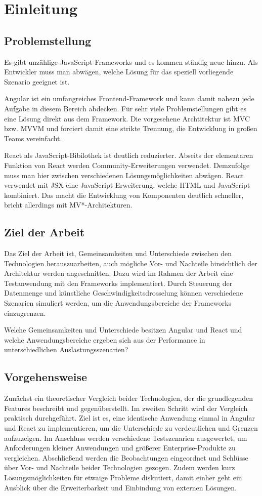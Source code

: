 \chapter{Einleitung}

\section{Problemstellung}
Es gibt unzählige JavaScript-Frameworks und es kommen ständig neue hinzu. Als Entwickler muss man abwägen,
welche Lösung für das speziell vorliegende Szenario geeignet ist.

Angular ist ein umfangreiches Frontend-Framework und kann damit nahezu
jede Aufgabe in diesem Bereich abdecken. Für sehr viele Problemstellungen
gibt es eine Lösung direkt aus dem Framework. Die vorgesehene Archtitektur ist
MVC bzw. MVVM und forciert damit eine strikte Trennung, die Entwicklung in großen Teams vereinfacht.

React als JavaScript-Bibilothek ist deutlich reduzierter. Abseits der elementaren Funktion von React
werden Community-Erweiterungen verwendet. Demzufolge muss man hier zwischen verschiedenen 
Lösungsmöglichkeiten abwägen. React verwendet mit JSX eine JavaScript-Erweiterung, 
welche HTML und JavaScript kombiniert. Das macht die Entwicklung von Komponenten deutlich schneller,
bricht allerdings mit MV*-Architekturen.

\section{Ziel der Arbeit}
Das Ziel der Arbeit ist, Gemeinsamkeiten und Unterschiede zwischen den Technologien herauszuarbeiten,
auch mögliche Vor- und Nachteile hinsichtlich der Architektur werden angeschnitten.
Dazu wird im Rahmen der Arbeit eine Testanwendung mit den Frameworks implementiert.
Durch Steuerung der Datenmenge und künstliche Geschwindigkeitsdrosselung können verschiedene
Szenarien simuliert werden, um die Anwendungsbereiche der Frameworks einzugrenzen.

Welche Gemeinsamkeiten und Unterschiede besitzen Angular und React und welche Anwendungsbereiche
ergeben sich aus der Performance in unterschiedlichen Auslastungsszenarien?

\section{Vorgehensweise}

Zunächst ein theoretischer Vergleich beider Technologien, der die grundlegenden Features beschreibt und gegenüberstellt.
Im zweiten Schritt wird der Vergleich praktisch durchgeführt. Ziel ist es, eine identische Anwendung einmal in Angular
und React zu implementieren, um die Unterschiede zu verdeutlichen und Grenzen aufzuzeigen. Im Anschluss werden verschiedene
Testszenarien ausgewertet, um Anforderungen kleiner Anwendungen und größerer Enterprise-Produkte zu vergleichen. 
Abschließend werden die Beobachtungen eingeordnet und Schlüsse über Vor- und Nachteile beider Technologien gezogen.
Zudem werden kurz Lösungsmöglichkeiten für etwaige Probleme diskutiert, damit einher geht ein Ausblick über 
die Erweiterbarkeit und Einbindung von externen Lösungen.

